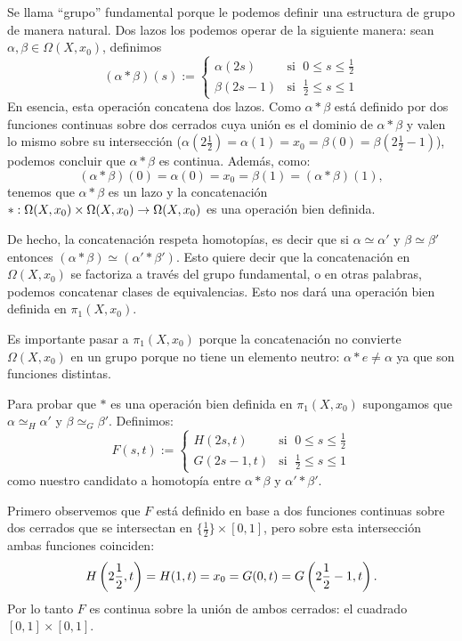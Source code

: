 \documentclass[../../topologia_algebraica]{subfiles}
\begin{document}
Se llama ``grupo'' fundamental porque le podemos definir una estructura de grupo de manera natural.
Dos lazos los podemos operar de la siguiente manera: sean $\alpha,\beta\in\Omega(X,x_0)$, definimos
\[
  (\alpha*\beta)(s):=
  \begin{cases}
    \alpha(2s) & \text{si }\; 0\leq s\leq \frac{1}{2}\\
    \beta(2s-1) & \text{si }\; \frac{1}{2}\leq s\leq 1
  \end{cases}
\]
En esencia, esta operaci\'on concatena dos lazos. Como $\alpha*\beta$ est\'a definido por dos funciones
continuas sobre dos cerrados cuya uni\'on es el dominio de $\alpha*\beta$ y valen lo mismo sobre su
intersecci\'on ($\alpha(2\frac{1}{2})=\alpha(1)=x_0=\beta(0)=\beta(2\frac{1}{2}-1)$), podemos concluir
que $\alpha*\beta$ es continua. Adem\'as, como:
\[
  (\alpha*\beta)(0)=\alpha(0)=x_0=\beta(1)=(\alpha*\beta)(1),
\]
tenemos que $\alpha*\beta$ es un lazo y la concatenaci\'on
$*:\Omega(X,x_0)\times\Omega(X,x_0)\rightarrow\Omega(X,x_0)$ es una operaci\'on bien definida.

De hecho, la concatenaci\'on respeta homotop\'ias, es decir que si $\alpha\simeq\alpha'$ y
$\beta\simeq\beta'$ entonces $(\alpha*\beta)\simeq(\alpha'*\beta')$. Esto quiere decir que la
concatenaci\'on en $\Omega(X,x_0)$ se factoriza a trav\'es del grupo fundamental, o en otras palabras,
podemos concatenar clases de equivalencias. Esto nos dar\'a una operaci\'on bien definida en
$\pi_1(X,x_0)$.

Es importante pasar a $\pi_1(X,x_0)$ porque la concatenaci\'on no convierte $\Omega(X,x_0)$ en un
grupo porque no tiene un elemento neutro: $\alpha*e\neq\alpha$ ya que son funciones distintas.

Para probar que $*$ es una operaci\'on bien definida en $\pi_1(X,x_0)$ supongamos que
$\alpha\simeq_H\alpha'$ y $\beta\simeq_G\beta'$. Definimos:
\[
  F(s,t):=
  \begin{cases}
    H(2s,t) & \text{si }\; 0\leq s\leq \frac{1}{2}\\
    G(2s-1,t) & \text{si }\; \frac{1}{2}\leq s\leq 1
  \end{cases}
\]
como nuestro candidato a homotop\'ia entre $\alpha*\beta$ y $\alpha'*\beta'$.

Primero observemos que $F$ est\'a definido en base a dos funciones continuas sobre dos cerrados que
se intersectan en $\{\frac{1}{2}\}\times[0,1]$, pero sobre esta intersecci\'on ambas funciones
coinciden:
\[
  H\left( 2\frac{1}{2},t \right)=H(1,t)=x_0=G(0,t)=G\left( 2\frac{1}{2}-1,t \right).
\]
Por lo tanto $F$ es continua sobre la uni\'on de ambos cerrados: el cuadrado $[0,1]\times[0,1]$.
\end{document}
